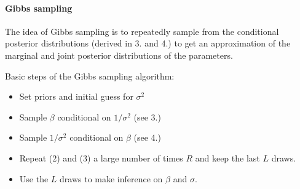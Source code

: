 \begin{enumerate}
\paragraph{Gibbs sampling}
The idea of Gibbs sampling is to repeatedly sample from the conditional posterior distributions (derived in {3.} and {4.})
  to get an approximation of the marginal and joint posterior distributions of the parameters.

Basic steps of the Gibbs sampling algorithm:
\begin{itemize}
\item Set priors and initial guess for \(\sigma^2\)
\item Sample \(\beta \) conditional on \(1/\sigma^2\) (see {3.})
\item Sample \(1/\sigma^2\) conditional on \(\beta \) (see {4.})
\item Repeat (2) and (3) a large number of times \(R\) and keep the last \(L\) draws.
\item Use the \(L\) draws to make inference on \(\beta \) and \(\sigma \).
\end{itemize}

\end{enumerate}